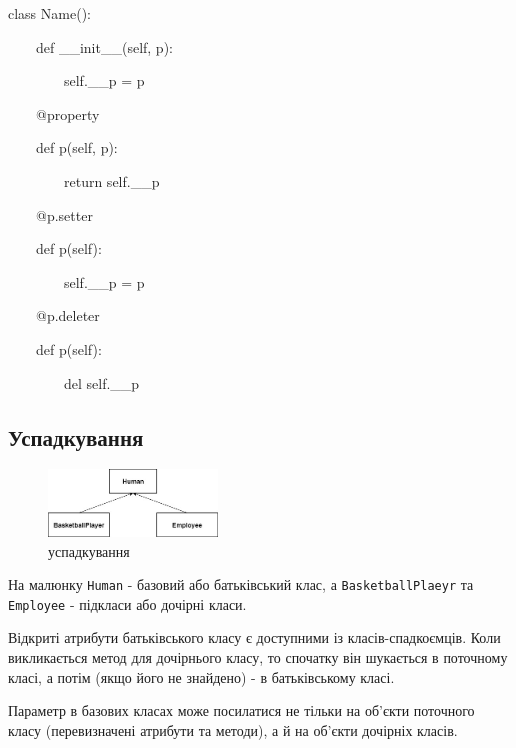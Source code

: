 \begin{frame}
class Name():

~~~~def \_\_init\_\_(self, p):

~~~~~~~~self.\_\_p = p

~~~~@property

~~~~def p(self, p):

~~~~~~~~return self.\_\_p

~~~~@p.setter

~~~~def p(self):

~~~~~~~~self.\_\_p = p

~~~~@p.deleter

~~~~def p(self):

~~~~~~~~del self.\_\_p

\end{frame}

\subsection{Успадкування} 
\begin{frame}
\begin{figure}
\begin{center}
 \includegraphics[width=0.4\textwidth]{pictures/inheritance.jpg}
\caption{успадкування}
\label{inheritance} 
\end{center}
\end{figure}

На малюнку \texttt{Human} - базовий або батьківський клас, а \texttt{BasketballPlaeyr} та \texttt{Employee} - підкласи або дочірні класи.

\end{frame}

\begin{frame}

Відкриті атрибути батьківського класу є доступними із класів-спадкоємців. Коли викликається метод для дочірнього класу, то спочатку він шукається в поточному класі, а потім (якщо його не знайдено) - в батьківському класі. 

Параметр в базових класах може посилатися не тільки на об'єкти поточного класу (перевизначені атрибути та методи), а й на об'єкти дочірніх класів.  

\end{frame}
